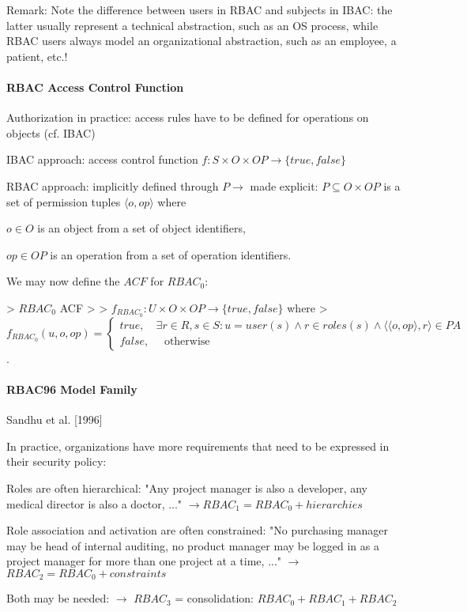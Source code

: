 \documentclass[a4paper]{article}
\begin{document}
\begin{multicols}{3}
    Remark:
    Note the difference between users in RBAC and subjects in IBAC: the latter usually represent a technical abstraction, such as an OS process, while RBAC users always model an organizational abstraction, such as an employee, a patient, etc.!

    \paragraph{RBAC Access Control Function}
    \begin{itemize*}
        \item Authorization in practice: access rules have to be defined for operations on objects (cf. IBAC)
        \item IBAC approach: access control function $f:S\times O\times OP\rightarrow \{true,false\}$
        \item RBAC approach: implicitly defined through $P\rightarrow$ made explicit: $P\subseteq O\times OP$ is a set of permission tuples $⟨o,op⟩$ where
              \begin{itemize*}
                  \item $o\in O$ is an object from a set of object identifiers,
                  \item $op\in OP$ is an operation from a set of operation identifiers.
              \end{itemize*}
        \item We may now define the $ACF$ for $RBAC_0$:
    \end{itemize*}

    > $RBAC_0$ ACF
    >
    > $f_{RBAC_0}:U \times O\times OP\rightarrow\{true,false\}$ where
    > $f_{RBAC_0} (u,o,op)= \begin{cases} true, \quad \exists r\in R,s\in S:u=user(s)\wedge r\in roles(s)\wedge ⟨⟨o,op⟩,r⟩ \in PA \\ false, \quad\text{ otherwise } \end{cases}$.

    \paragraph{RBAC96 Model Family}
    Sandhu et al. [1996]

    In practice, organizations have more requirements that need to be expressed in their security policy:
    \begin{itemize*}
        \item Roles are often hierarchical: "Any project manager is also a developer, any medical director is also a doctor, ..." $\rightarrow RBAC_1 = RBAC_0 + hierarchies$
        \item Role association and activation are often constrained: "No purchasing manager may be head of internal auditing, no product manager may be logged in as a project manager for more than one project at a time, ..." $\rightarrow$ $RBAC_2 = RBAC_0 + constraints$
        \item Both may be needed: $\rightarrow$ $RBAC_3$ = consolidation: $RBAC_0 + RBAC_1 + RBAC_2$
    \end{itemize*}


\end{multicols}
\end{document}
